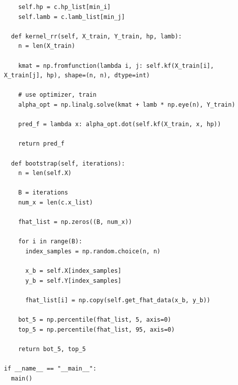 \documentclass{article}
\newcommand{\1}{\mathbf{1}}
\begin{document}
{\begin{verbatim}
    self.hp = c.hp_list[min_i]
    self.lamb = c.lamb_list[min_j]

  def kernel_rr(self, X_train, Y_train, hp, lamb):
    n = len(X_train)

    kmat = np.fromfunction(lambda i, j: self.kf(X_train[i], X_train[j], hp), shape=(n, n), dtype=int)

    # use optimizer, train
    alpha_opt = np.linalg.solve(kmat + lamb * np.eye(n), Y_train)

    pred_f = lambda x: alpha_opt.dot(self.kf(X_train, x, hp))

    return pred_f

  def bootstrap(self, iterations):
    n = len(self.X)

    B = iterations
    num_x = len(c.x_list)

    fhat_list = np.zeros((B, num_x))

    for i in range(B):
      index_samples = np.random.choice(n, n)

      x_b = self.X[index_samples]
      y_b = self.Y[index_samples]

      fhat_list[i] = np.copy(self.get_fhat_data(x_b, y_b))

    bot_5 = np.percentile(fhat_list, 5, axis=0)
    top_5 = np.percentile(fhat_list, 95, axis=0)

    return bot_5, top_5

if __name__ == "__main__":
  main()

\end{verbatim}

\newpage

}
\end{document}
